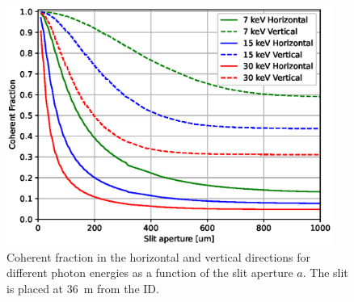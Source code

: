 \documentclass{iucr}              %
\begin{document}
\begin{figure}
    \centering
    \includegraphics[width=0.95\textwidth]{figures/cf_vs_aperture.eps}

    \caption{
    Coherent fraction in the horizontal and vertical directions for different photon energies as a function of the slit aperture $a$. The slit is placed at \SI{36}{\meter} from the ID. 
    }
    \label{fig:cf_vs_aperture}
\end{figure}
\end{document}
